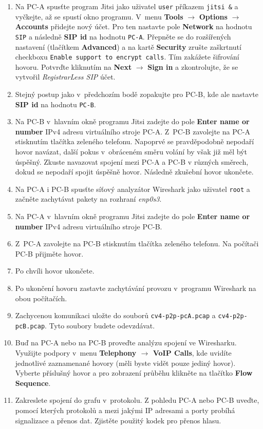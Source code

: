\begin{enumerate}
    \item Na PC-A spusťte program Jitsi jako uživatel \texttt{user} příkazem \texttt{jitsi \&} a vyčkejte, až se spustí okno programu.
	V~menu {\bf Tools} $\rightarrow$ {\bf Options} $\rightarrow$ {\bf Accounts} přidejte nový účet. Pro ten nastavte pole {\bf Network} na hodnotu {\tt SIP} a následně {\bf SIP id} na hodnotu {\tt PC-A}.
	Přepněte se do rozšířených nastavení (tlačítkem {\bf Advanced}) a na kartě {\bf Security} zrušte zaškrtnutí checkboxu {\tt Enable support to encrypt calls}. Tím zakážete šifrování hovoru. Potvrďte kliknutím na \textbf{Next} $\rightarrow$ \textbf{Sign in} a zkontrolujte, že se vytvořil \emph{RegistrarLess SIP} účet.
    \item Stejný postup jako v~předchozím bodě zopakujte pro PC-B, kde ale nastavte {\bf SIP id} na hodnotu {\tt PC-B}.
	\item Na PC-B v hlavním okně programu Jitsi zadejte do pole {\bf Enter name or number} IPv4 adresu virtuálního stroje PC-A.
	Z~PC-B zavolejte na PC-A stisknutím tlačítka zeleného telefonu. Napoprvé se pravděpodobně nepodaří hovor navázat, další pokus v~obráceném směru volání by však již měl být úspěšný.
	Zkuste navazovat spojení mezi PC-A a PC-B v různých směrech, dokud se nepodaří spojit úspěšně hovor. Následně zkušební hovor ukončete.
	\item Na PC-A i PC-B spusťte síťový analyzátor Wireshark jako uživatel \texttt{root} a začněte zachytávat pakety na rozhraní \emph{enp0s3}.
    \item Na PC-A v hlavním okně programu Jitsi zadejte do pole {\bf Enter name or number} IPv4 adresu virtuálního stroje PC-B.
    \item Z~PC-A zavolejte na PC-B stisknutím tlačítka zeleného telefonu. Na počítači PC-B přijměte hovor.
	\item Po chvíli hovor ukončete.
	\item Po ukončení hovoru zastavte zachytávání provozu v~programu Wireshark na obou počítačích.
	\item Zachycenou komunikaci uložte do souborů \texttt{cv4-p2p-pcA.pcap} a \texttt{cv4-p2p-pcB.pcap}. Tyto soubory budete odevzdávat.
    \item Buď na PC-A nebo na PC-B proveďte analýzu spojení ve Wiresharku. Využijte podpory v~menu {\bf Telephony $\rightarrow$ VoIP Calls}, kde uvidíte jednotlivé zaznamenané hovory (měli byste vidět pouze jediný hovor). Vyberte příslušný hovor a pro zobrazení průběhu klikněte na tlačítko {\bf Flow Sequence}.
    \item Zakreslete spojení do grafu v~protokolu. Z pohledu PC-A nebo PC-B uveďte, pomocí kterých protokolů a mezi jakými IP adresami a porty probíhá signalizace a přenos dat. Zjistěte použitý kodek pro přenos hlasu.\\


\end{enumerate}
